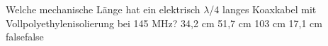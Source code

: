     {Welche mechanische Länge hat ein elektrisch $\lambda$/4 langes Koaxkabel mit Vollpolyethylenisolierung bei 145 MHz?}
    {34,2 cm}
    {51,7 cm}
    {103 cm}
    {17,1 cm}
    {false}{false}